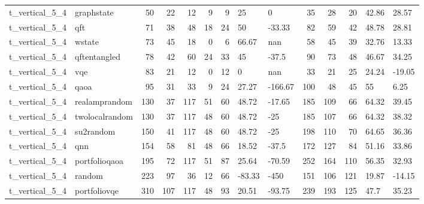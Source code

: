 \begin{longtable}{llrrrrrllrrrll}
t\_vertical\_5\_4 & graphstate & 50 & 22 & 12 & 9 & 9 & 25 & 0 & 35 & 28 & 20 & 42.86 & 28.57 \\
t\_vertical\_5\_4 & qft & 71 & 38 & 48 & 18 & 24 & 50 & -33.33 & 82 & 59 & 42 & 48.78 & 28.81 \\
t\_vertical\_5\_4 & wstate & 73 & 45 & 18 & 0 & 6 & 66.67 & nan & 58 & 45 & 39 & 32.76 & 13.33 \\
t\_vertical\_5\_4 & qftentangled & 78 & 42 & 60 & 24 & 33 & 45 & -37.5 & 90 & 73 & 48 & 46.67 & 34.25 \\
t\_vertical\_5\_4 & vqe & 83 & 21 & 12 & 0 & 12 & 0 & nan & 33 & 21 & 25 & 24.24 & -19.05 \\
t\_vertical\_5\_4 & qaoa & 95 & 31 & 33 & 9 & 24 & 27.27 & -166.67 & 100 & 48 & 45 & 55 & 6.25 \\
t\_vertical\_5\_4 & realamprandom & 130 & 37 & 117 & 51 & 60 & 48.72 & -17.65 & 185 & 109 & 66 & 64.32 & 39.45 \\
t\_vertical\_5\_4 & twolocalrandom & 130 & 37 & 117 & 48 & 60 & 48.72 & -25 & 185 & 107 & 66 & 64.32 & 38.32 \\
t\_vertical\_5\_4 & su2random & 150 & 41 & 117 & 48 & 60 & 48.72 & -25 & 198 & 110 & 70 & 64.65 & 36.36 \\
t\_vertical\_5\_4 & qnn & 154 & 58 & 81 & 48 & 66 & 18.52 & -37.5 & 172 & 127 & 84 & 51.16 & 33.86 \\
t\_vertical\_5\_4 & portfolioqaoa & 195 & 72 & 117 & 51 & 87 & 25.64 & -70.59 & 252 & 164 & 110 & 56.35 & 32.93 \\
t\_vertical\_5\_4 & random & 223 & 97 & 36 & 12 & 66 & -83.33 & -450 & 151 & 106 & 121 & 19.87 & -14.15 \\
t\_vertical\_5\_4 & portfoliovqe & 310 & 107 & 117 & 48 & 93 & 20.51 & -93.75 & 239 & 193 & 125 & 47.7 & 35.23 \\
\end{longtable}
